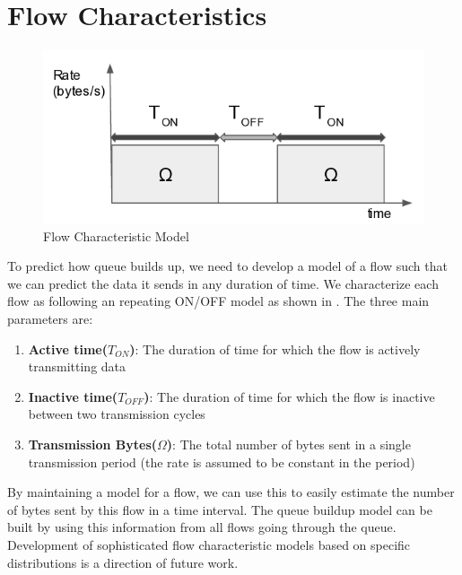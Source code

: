 \section{Flow Characteristics}
\begin{figure}[H]
	\centering
	\includegraphics[width=\columnwidth]{flowchar.png}
	\caption{Flow Characteristic Model}
	\label{fig:flowchar}
\end{figure}
To predict how queue builds up, we need to develop a model of a flow 
such that we can predict the data it sends in any duration of time. We 
characterize each flow as following an repeating ON/OFF model \cite{datacentertraffic}
as shown in . The three main parameters are:
\begin{enumerate}
	\item \textbf{Active time($T_{ON}$)}: The duration of time 
	for which the flow is actively transmitting data
	\item \textbf{Inactive time($T_{OFF}$)}: The duration of time 
	for which the flow is inactive between two transmission cycles
	\item \textbf{Transmission Bytes($\Omega$)}: The total number
	of bytes sent in a single transmission period (the rate is assumed
	to be constant in the period)
\end{enumerate}
By maintaining a model for a flow, we can use this to easily estimate
the number of bytes sent by this flow in a time interval. The queue
buildup model can be built by using this information from all flows
going through the queue. Development of sophisticated flow characteristic
models based on specific distributions is a direction of future work. 

